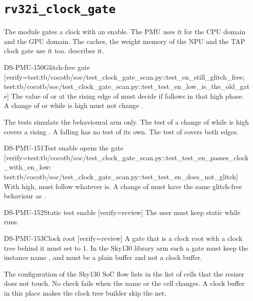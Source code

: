 \section{\texttt{rv32i\_clock\_gate}}\label{ds:mod:rv32i-clock-gate}
The module  gates a clock with an enable. The PMU uses it for the CPU domain and the GPU domain. The caches, the weight memory of the NPU and the TAP clock gate use it too.  describes it.

\begin{requirement}{DS-PMU-150}{Glitch-free gate}
[verify={test:tb/cocotb/soc/test_clock_gate_scan.py::test_en_still_glitch_free; test:tb/cocotb/soc/test_clock_gate_scan.py::test_test_en_low_is_the_old_gate}]
The value of  or  at the rising edge of  must decide if  follows  in that high phase. A change of  or  while  is high must not change .
\end{requirement}
\begin{information}
The tests simulate the behavioural arm only. The test of a change of  while  is high covers a rising . A falling  has no test of its own. The test of  covers both edges.
\end{information}

\begin{requirement}{DS-PMU-151}{Test enable opens the gate}
[verify={test:tb/cocotb/soc/test_clock_gate_scan.py::test_test_en_passes_clock_with_en_low; test:tb/cocotb/soc/test_clock_gate_scan.py::test_test_en_does_not_glitch}]
With  high,  must follow  whatever  is. A change of  must have the same glitch-free behaviour as .
\end{requirement}

\begin{requirement}{DS-PMU-152}{Static test enable}
[verify={review}]
The user must keep  static while  runs.
\end{requirement}

\begin{requirement}{DS-PMU-153}{Clock root}
[verify={review}]
A gate that is a clock root with a clock tree behind it must set  to 1. In the Sky130 library arm such a gate must keep the instance name , and  must be a plain buffer and not a clock buffer.
\end{requirement}
\begin{information}
The configuration of the Sky130 SoC flow lists  in the list of cells that the resizer does not touch. No check fails when the name or the cell changes. A clock buffer in this place makes the clock tree builder skip the net.
\end{information}

